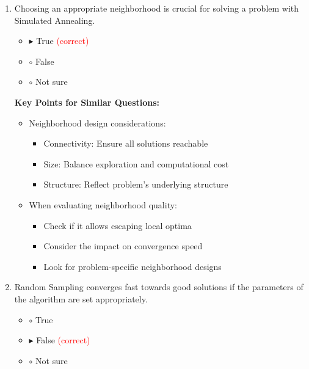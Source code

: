 \begin{enumerate}[label=\alph*)]
\item Choosing an appropriate neighborhood is crucial for solving a problem with Simulated Annealing.
\begin{itemize}
\item $\blacktriangleright$ True \hspace{1em} \textcolor{red}{(correct)}
\item $\circ$ False
\item $\circ$ Not sure
\end{itemize}

\textbf{Key Points for Similar Questions:}
\begin{itemize}
\item Neighborhood design considerations:
  \begin{itemize}
  \item Connectivity: Ensure all solutions reachable
  \item Size: Balance exploration and computational cost
  \item Structure: Reflect problem's underlying structure
  \end{itemize}
\item When evaluating neighborhood quality:
  \begin{itemize}
  \item Check if it allows escaping local optima
  \item Consider the impact on convergence speed
  \item Look for problem-specific neighborhood designs
  \end{itemize}
\end{itemize}

\item Random Sampling converges fast towards good solutions if the parameters of the algorithm are set appropriately.
\begin{itemize}
\item $\circ$ True
\item $\blacktriangleright$ False \hspace{1em} \textcolor{red}{(correct)}
\item $\circ$ Not sure
\end{itemize}


\end{enumerate}
